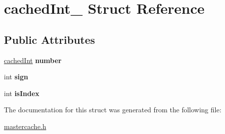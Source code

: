 \hypertarget{structcachedInt__}{}\section{cached\+Int\+\_\+ Struct Reference}
\label{structcachedInt__}
\subsection*{Public Attributes}
\begin{DoxyCompactItemize}
\item 
\hyperlink{mastercache_8h_a113c03970467afb459ed5ae157d0a870}{cached\+Int} {\bfseries number}\hypertarget{structcachedInt___afe8abc24a4d53117a450c16b8cb79b69}{}\label{structcachedInt___afe8abc24a4d53117a450c16b8cb79b69}

\item 
int {\bfseries sign}\hypertarget{structcachedInt___ae7c0cf9d86c3b97a44ad5afad8a165e8}{}\label{structcachedInt___ae7c0cf9d86c3b97a44ad5afad8a165e8}

\item 
int {\bfseries is\+Index}\hypertarget{structcachedInt___a955f01118a23c5ec2758d77df598f64d}{}\label{structcachedInt___a955f01118a23c5ec2758d77df598f64d}

\end{DoxyCompactItemize}


The documentation for this struct was generated from the following file\+:\begin{DoxyCompactItemize}
\item 
\hyperlink{mastercache_8h}{mastercache.\+h}\end{DoxyCompactItemize}
